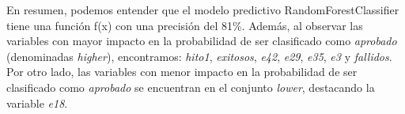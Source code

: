En resumen, podemos entender que el modelo predictivo RandomForestClassifier tiene una función f(x) con una precisión del 81\%. Además, al observar las variables con mayor impacto en la probabilidad de ser clasificado como \textit{aprobado} (denominadas \textit{higher}), encontramos: \textit{hito1}, \textit{exitosos}, \textit{e42}, \textit{e29}, \textit{e35}, \textit{e3} y \textit{fallidos}. Por otro lado, las variables con menor impacto en la probabilidad de ser clasificado como \textit{aprobado} se encuentran en el conjunto \textit{lower}, destacando la variable \textit{e18}.







